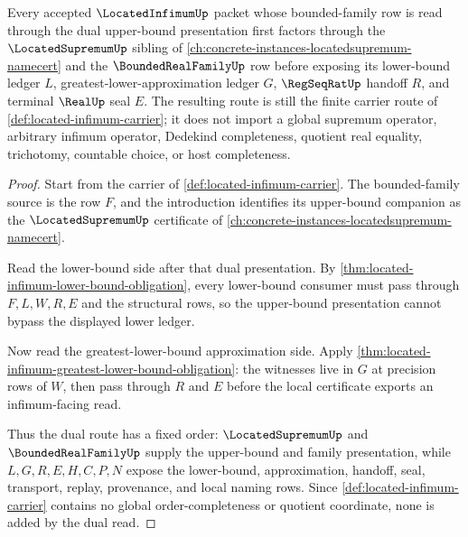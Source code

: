 \begin{theorem}
\label{thm:located-infimum-supremum-dual-route}
Every accepted $\LocatedInfimumUp$ packet whose bounded-family row is read through the dual upper-bound presentation first factors through the $\LocatedSupremumUp$ sibling of \autoref{ch:concrete-instances-locatedsupremum-namecert} and the $\BoundedRealFamilyUp$ row before exposing its lower-bound ledger $L$, greatest-lower-approximation ledger $G$, $\RegSeqRatUp$ handoff $R$, and terminal $\RealUp$ seal $E$. The resulting route is still the finite carrier route of \autoref{def:located-infimum-carrier}; it does not import a global supremum operator, arbitrary infimum operator, Dedekind completeness, quotient real equality, trichotomy, countable choice, or host completeness.
\end{theorem}
\begin{proof}
Start from the carrier of \autoref{def:located-infimum-carrier}. The bounded-family source is the row $F$, and the introduction identifies its upper-bound companion as the $\LocatedSupremumUp$ certificate of \autoref{ch:concrete-instances-locatedsupremum-namecert}.

Read the lower-bound side after that dual presentation. By \autoref{thm:located-infimum-lower-bound-obligation}, every lower-bound consumer must pass through $F,L,W,R,E$ and the structural rows, so the upper-bound presentation cannot bypass the displayed lower ledger.

Now read the greatest-lower-bound approximation side. Apply \autoref{thm:located-infimum-greatest-lower-bound-obligation}: the witnesses live in $G$ at precision rows of $W$, then pass through $R$ and $E$ before the local certificate exports an infimum-facing read.

Thus the dual route has a fixed order: $\LocatedSupremumUp$ and $\BoundedRealFamilyUp$ supply the upper-bound and family presentation, while $L,G,R,E,H,C,P,N$ expose the lower-bound, approximation, handoff, seal, transport, replay, provenance, and local naming rows. Since \autoref{def:located-infimum-carrier} contains no global order-completeness or quotient coordinate, none is added by the dual read.
\end{proof}

